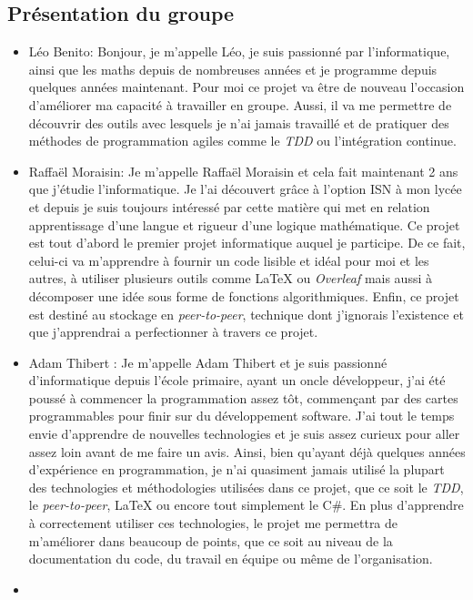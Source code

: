 \documentclass[11pt, a4paper]{specifications}
\begin{document}
    \subsection{Présentation du groupe}
\begin{itemize}
  \item
  Léo Benito: \og Bonjour, je m'appelle Léo, je suis passionné par l'informatique, ainsi que les maths depuis de nombreuses années et je programme depuis quelques années maintenant. Pour moi ce projet va être de nouveau l'occasion d'améliorer ma capacité à travailler en groupe. Aussi, il va me permettre de découvrir des outils avec lesquels je n'ai jamais travaillé et de pratiquer des méthodes de programmation agiles comme le \textit{TDD} ou l'intégration continue. \fg
  \item
  Raffaël Moraisin: \og Je m'appelle Raffaël Moraisin et cela fait maintenant 2 ans que j'étudie l'informatique. Je l'ai découvert grâce à l'option ISN à mon lycée et depuis je suis toujours intéressé par cette matière qui met en relation apprentissage d'une langue et rigueur d'une logique mathématique. Ce projet est tout d’abord le premier projet informatique auquel je participe. De ce fait, celui-ci va m’apprendre à fournir un code lisible et idéal pour moi et les autres, à utiliser plusieurs outils comme \LaTeX{} ou \textit{Overleaf} mais aussi à décomposer une idée sous forme de fonctions algorithmiques. Enfin, ce projet est destiné au stockage en \textit{peer-to-peer}, technique dont j’ignorais l’existence et que j’apprendrai a perfectionner à travers ce projet. \fg
  \item
  Adam Thibert : \og Je m'appelle Adam Thibert et je suis passionné d'informatique depuis l'école primaire, ayant un oncle développeur, j'ai été poussé à commencer la programmation assez tôt, commençant par des cartes programmables pour finir sur du développement software. J'ai tout le temps envie d'apprendre de nouvelles technologies et je suis assez curieux pour aller assez loin avant de me faire un avis. Ainsi, bien qu'ayant déjà quelques années d'expérience en programmation, je n'ai quasiment jamais utilisé la plupart des technologies et méthodologies utilisées dans ce projet, que ce soit le \textit{TDD}, le \textit{peer-to-peer}, \LaTeX{} ou encore tout simplement le C\#. En plus d'apprendre à correctement utiliser ces technologies, le projet me permettra de m'améliorer dans beaucoup de points, que ce soit au niveau de la documentation du code, du travail en équipe ou même de l'organisation. \fg
  \item

\end{itemize}
\end{document}
